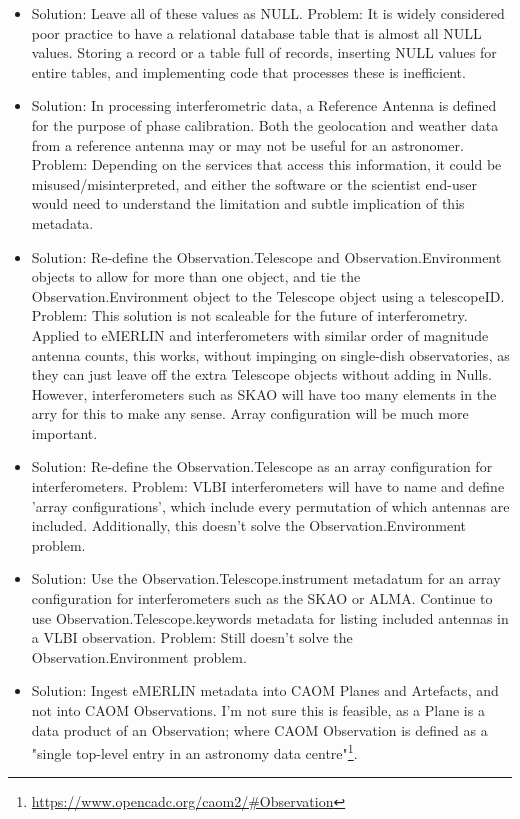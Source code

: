 \begin{itemize}
\item Solution: Leave all of these values as NULL.
Problem: It is widely considered poor practice to have a relational database table that is almost all NULL values. Storing a record or a table full of records, inserting NULL values for entire tables, and implementing code that processes these is inefficient.

\item Solution: In processing interferometric data, a Reference Antenna is defined for the purpose of phase calibration.  Both the geolocation and weather data from a reference antenna may or may not be useful for an astronomer.  
Problem:  Depending on the services that access this information, it could be misused/misinterpreted, and either the software or the scientist end-user would need to understand the limitation and subtle implication of this metadata.

\item Solution: Re-define the Observation.Telescope and Observation.Environment objects to allow for more than one object, and tie the Observation.Environment object to the Telescope object using a telescopeID.  
Problem:  This solution is not scaleable for the future of interferometry.  Applied to eMERLIN and interferometers with similar order of magnitude antenna counts, this works, without impinging on single-dish observatories, as they can just leave off the extra Telescope objects without adding in Nulls.  However, interferometers such as SKAO will have too many elements in the arry for this to make any sense.  Array configuration will be much more important.

\item Solution:  Re-define the Observation.Telescope as an array configuration for interferometers.
Problem: VLBI interferometers will have to name and define 'array configurations', which include every permutation of which antennas are included.  Additionally, this doesn't solve the Observation.Environment problem.

\item Solution:  Use the Observation.Telescope.instrument metadatum for an array configuration for interferometers such as the SKAO or ALMA.  Continue to use Observation.Telescope.keywords metadata for listing included antennas in a VLBI observation.
Problem:  Still doesn't solve the Observation.Environment problem.

\item Solution:  Ingest eMERLIN metadata into CAOM Planes and Artefacts, and not into CAOM Observations.  I'm not sure this is feasible, as a Plane is a data product of an Observation; where CAOM Observation is defined as a "single top-level entry in an astronomy data centre"\footnote{\url{https://www.opencadc.org/caom2/\#Observation}}.
\end{itemize}


